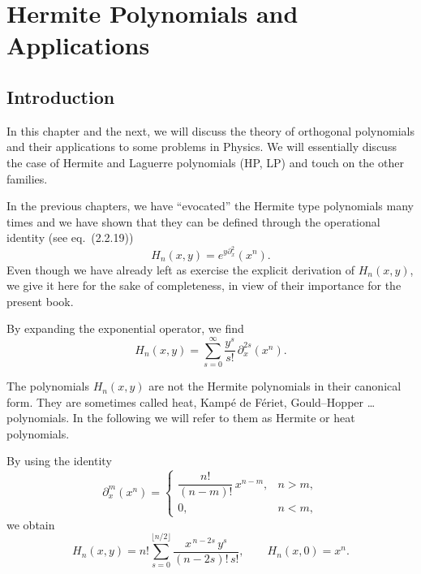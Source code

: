 
\chapter{Hermite Polynomials and Applications}

\section{Introduction}
\label{sec:3.1}

In this chapter and the next, we will discuss the theory of orthogonal
polynomials and their applications to some problems in Physics. We will
essentially discuss the case of Hermite and Laguerre polynomials (HP,
LP) and touch on the other families.

In the previous chapters, we have ``evocated'' the Hermite type
polynomials many times and we have shown that they can be defined
through the operational identity (see eq.~(2.2.19))
\begin{equation}
H_n(x,y)=e^{y\partial_x^2}(x^n).
\label{eq:3.1.1}
\end{equation}
Even though we have already left as exercise the explicit derivation of
$H_n(x,y)$, we give it here for the sake of completeness, in view of
their importance for the present book.

By expanding the exponential operator, we find
\begin{equation}
H_n(x,y)=\sum_{s=0}^{\infty}\frac{y^s}{s!}\,\partial_x^{2s}(x^n).
\label{eq:3.1.2}
\end{equation}

 The polynomials $H_n(x,y)$ are not the Hermite
polynomials in their canonical form. They are sometimes called heat,
Kamp\'e de F\'eriet, Gould--Hopper \ldots{} polynomials. In the
following we will refer to them as Hermite or heat polynomials.

By using the identity
\[
\partial_x^m(x^n)=
\begin{cases}
\dfrac{n!}{(n-m)!}\,x^{n-m}, & n>m,\\[6pt]
0, & n<m,
\end{cases}
\label{eq:3.1.3}
\]
we obtain
\begin{equation}
H_n(x,y)=n!\sum_{s=0}^{\lfloor n/2\rfloor}
\frac{x^{\,n-2s}\,y^s}{(n-2s)!\,s!},
\qquad H_n(x,0)=x^n.
\label{eq:3.1.4}
\end{equation}

